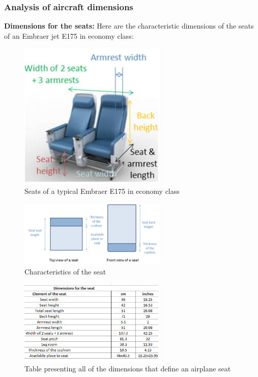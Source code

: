 \subsubsection*{Analysis of aircraft dimensions}
\textbf{Dimensions for the seats:}
Here are the characteristic dimensions of the seats of an Embraer jet E175 in economy class:
\begin{figure}[h]
\centering
\includegraphics[width=7cm]{images/seat_dimensions_image_global.png}
\caption{Seats of a typical Embraer E175 in economy class}
\label{fig:seat_dimensions_1}
\end{figure}

\begin{figure}[h]
\centering
\includegraphics[width=7cm]{images/seat_dimensions_image_topandfront_view.png}
\caption{Characteristics of the seat}
\label{fig: seat_dimensions_2}
\end{figure}

\begin{figure}[h]
\centering
\includegraphics[width=7cm]{images/seat_dimensions_table}
\caption{Table presenting all of the dimensions that define an airplane seat}
\label{fig: seat_dimensions_table}
\end{figure}

